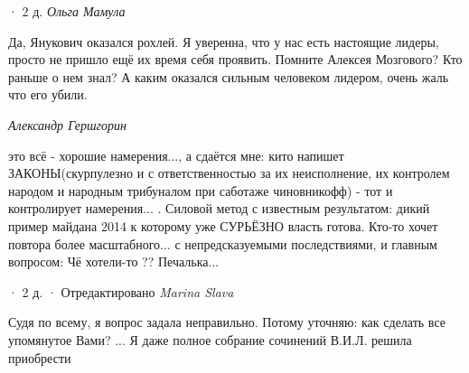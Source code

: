 \begin{itemize}
\begin{itemize}
 · 2 д.
\emph{Ольга Мамула}

Да, Янукович оказался рохлей. Я уверенна, что у нас есть настоящие лидеры,
просто не пришло ещё их время себя проявить. Помните Алексея Мозгового? Кто
раньше о нем знал? А каким оказался сильным человеком лидером, очень жаль что
его убили.

\end{itemize}

\emph{Александр Гершгорин}

это всё - хорошие намерения..., а сдаётся мне: кито напишет ЗАКОНЫ(скурпулезно
и с ответственностью за их неисполнение, их контролем народом и народным
трибуналом при саботаже чиновникофф) - тот и контролирует намерения... .
Силовой метод с известным результатом: дикий пример майдана 2014 к которому уже
СУРЬЁЗНО власть готова. Кто-то хочет повтора более масштабного... с
непредсказуемыми последствиями, и главным вопросом: Чё хотели-то ?? Печалька...

 · 2 д. · Отредактировано
\emph{Marina Slava}

Судя по всему, я вопрос задала неправильно.
Потому уточняю: как сделать все упомянутое Вами?
...
Я даже полное собрание сочинений В.И.Л. решила приобрести

\end{itemize}

